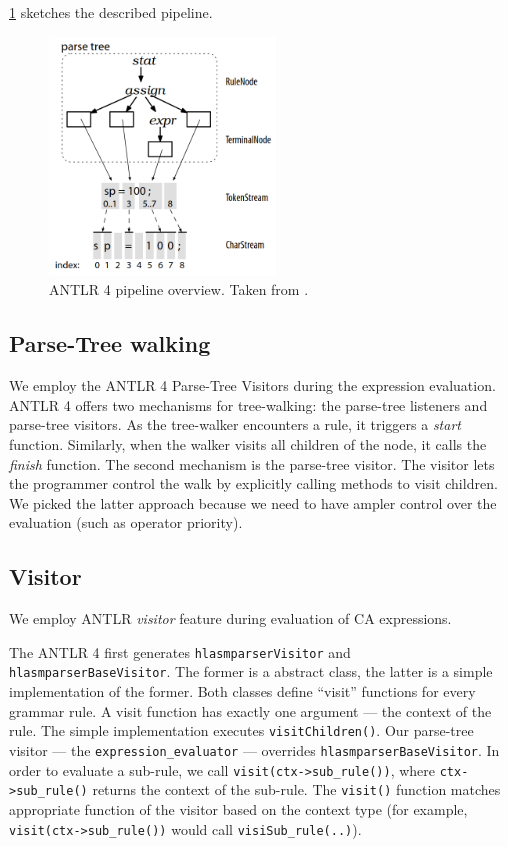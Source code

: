 \cref{antlr_pipeline} sketches the described pipeline.

\begin{figure}[H]
	\centering
	\includegraphics[width=6cm]{img/antlr_pipeline}
	\caption{ANTLR 4 pipeline overview. Taken from \cite{parr2013definitive}.}
	\label{antlr_pipeline}
\end{figure}

\subsection{Parse-Tree walking}

We employ the ANTLR 4 Parse-Tree Visitors during the expression evaluation. ANTLR 4 offers two mechanisms for tree-walking: the parse-tree listeners and parse-tree visitors. As the tree-walker encounters a rule, it triggers a \emph{start} function. Similarly, when the walker visits all children of the node, it calls the \emph{finish} function.  The second mechanism is the parse-tree visitor. The visitor lets the programmer control the walk by explicitly calling methods to visit children. We picked the latter approach because we need to have ampler control over the evaluation (such as operator priority).

\subsection{Visitor}

We employ ANTLR \emph{visitor} feature during evaluation of CA expressions. 

The ANTLR 4 first generates \texttt{hlasmparserVisitor} and \texttt{hlasmparserBaseVisitor}. The former is a abstract class, the latter is a simple implementation of the former. Both classes define ``visit'' functions for every grammar rule. A visit function has exactly one argument --- the context of the rule. The simple implementation executes \texttt{visitChildren()}. Our parse-tree visitor --- the \texttt{expression\_evaluator} --- overrides \texttt{hlasmparserBaseVisitor}. In order to evaluate a sub-rule, we call \texttt{visit(ctx->sub\_rule())}, where \texttt{ctx->sub\_rule()} returns the context of the sub-rule. The \texttt{visit()} function matches appropriate function of the visitor based on the context type (for example, \texttt{visit(ctx->sub\_rule())} would call \texttt{visiSub\_rule(..)}).

